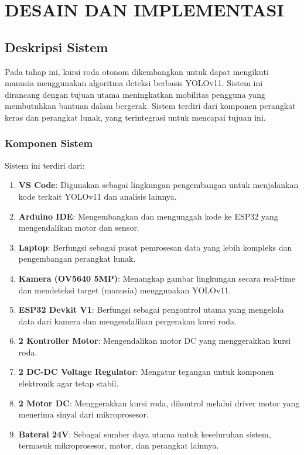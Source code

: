\chapter{DESAIN DAN IMPLEMENTASI}
\label{chap:desainimplementasi}


\section{Deskripsi Sistem}
\label{sec:deskripsisistem}

Pada tahap ini, kursi roda otonom dikembangkan untuk dapat mengikuti manusia menggunakan algoritma deteksi berbasis YOLOv11. Sistem ini dirancang dengan tujuan utama meningkatkan mobilitas pengguna yang membutuhkan bantuan dalam bergerak. Sistem terdiri dari komponen perangkat keras dan perangkat lunak, yang terintegrasi untuk mencapai tujuan ini.

\subsection{Komponen Sistem}
\label{subsec:komponensistem}

Sistem ini terdiri dari:

\begin{enumerate}[nolistsep]
    \item \textbf{VS Code}: Digunakan sebagai lingkungan pengembangan untuk menjalankan kode terkait YOLOv11 dan analisis lainnya.
    \item \textbf{Arduino IDE}: Mengembangkan dan mengunggah kode ke ESP32 yang mengendalikan motor dan sensor.
    \item \textbf{Laptop}: Berfungsi sebagai pusat pemrosesan data yang lebih kompleks dan pengembangan perangkat lunak.
    \item \textbf{Kamera (OV5640 5MP)}: Menangkap gambar lingkungan secara real-time dan mendeteksi target (manusia) menggunakan YOLOv11.
    \item \textbf{ESP32 Devkit V1}: Berfungsi sebagai pengontrol utama yang mengelola data dari kamera dan mengendalikan pergerakan kursi roda.
    \item \textbf{2 Kontroller Motor}: Mengendalikan motor DC yang menggerakkan kursi roda.
    \item \textbf{2 DC-DC Voltage Regulator}: Mengatur tegangan untuk komponen elektronik agar tetap stabil.
    \item \textbf{2 Motor DC}: Menggerakkan kursi roda, dikontrol melalui driver motor yang menerima sinyal dari mikroprosesor.
    \item \textbf{Baterai 24V}: Sebagai sumber daya utama untuk keseluruhan sistem, termasuk mikroprosesor, motor, dan perangkat lainnya.
\end{enumerate}

